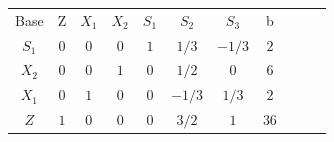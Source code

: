 \begin{frame}
{\begin{table}
\begin{tabular}{c c c c c c c c c c c}
				\cline{1-8} 
				\cellcolor{blue!100} \color{white} \scriptsize Base 
				&\cellcolor{blue!100} \color{white} \scriptsize Z 
				&\cellcolor{blue!100} \color{red} $\scriptstyle X_1$ 
				&\cellcolor{blue!100} \color{red} $\scriptstyle X_2$ 
				&\cellcolor{blue!100} \color{red} $\scriptstyle S_1$ 
				&\cellcolor{blue!100} \color{white} $\scriptstyle S_2$ 
				&\cellcolor{blue!100} \color{white} $\scriptstyle S_3$ 
				&\cellcolor{blue!100} \color{white} \scriptsize b
				&
				&
				& \\
				\cline{1-8}
				\cellcolor{blue!100} \color{red} $\scriptstyle S_1$
				& \cellcolor{yellow!50} $\scriptstyle 0$
				& \cellcolor{yellow!50} $\scriptstyle 0$
				& \cellcolor{yellow!50} $\scriptstyle 0$
				& \cellcolor{yellow!50} $\scriptstyle 1$
				& \cellcolor{yellow!50} $\scriptstyle 1/3$
				& \cellcolor{yellow!50} $\scriptstyle -1/3$
				& \cellcolor{yellow!50} $\scriptstyle 2$
				&
				&
				& \\
				\cline{1-8} 
			    \cellcolor{blue!100} \color{red} $\scriptstyle X_2$
				& \cellcolor{yellow!50} $\scriptstyle 0$
				& \cellcolor{yellow!50} $\scriptstyle 0$
				& \cellcolor{yellow!50} $\scriptstyle 1$
				& \cellcolor{yellow!50} $\scriptstyle 0$			
				& \cellcolor{yellow!50} $\scriptstyle 1/2$
				& \cellcolor{yellow!50} $\scriptstyle 0$
				& \cellcolor{yellow!50} $\scriptstyle 6$
				&
				&
				& \\
				\cline{1-8} 
				\cellcolor{blue!100} \color{red} $\scriptstyle X_1$
				& \cellcolor{yellow!50} $\scriptstyle 0$
				& \cellcolor{yellow!50} $\scriptstyle 1$
				& \cellcolor{yellow!50} $\scriptstyle 0$
				& \cellcolor{yellow!50} $\scriptstyle 0$
				& \cellcolor{yellow!50} $\scriptstyle -1/3$
				& \cellcolor{yellow!50} $\scriptstyle 1/3$
				& \cellcolor{yellow!50} $\scriptstyle 2$
				&
				&
				& \\
				\cline{1-8}
				\cellcolor{blue!100} \color{white} $\scriptstyle Z$
				& \cellcolor{yellow!50} $\scriptstyle 1$
				& \cellcolor{yellow!50} $\scriptstyle 0$
				& \cellcolor{yellow!50} $\scriptstyle 0$
				& \cellcolor{yellow!50} $\scriptstyle 0$
				& \cellcolor{yellow!50} $\scriptstyle 3/2$
				& \cellcolor{yellow!50} $\scriptstyle 1$
				& \cellcolor{yellow!50} $\scriptstyle 36$ 
				&
				&
				& \\
				\cline{1-8}
			\end{tabular}
		\end{table}			
	}	
	

\end{frame}
